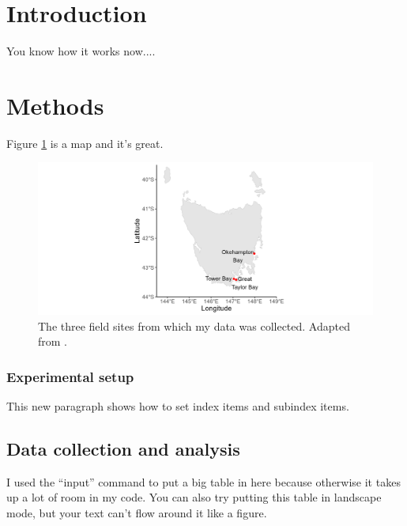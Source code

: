 \section{Introduction}
You know how it works now....

\section{Methods}

Figure \ref{2-fig:sites} is a map and it's great.

\begin{figure}[htbp]
    \centering
    \includegraphics[width=0.85\linewidth, trim={4cm 0cm 4cm 0cm}, %
        clip]{figures/C2_1st_data_chapter/map.png}
    \caption[
        The three field sites from which my data was collected
    ]{
        The three field sites from which my data was collected. Adapted from \citet{biancacci_optimisation_2022}.
    } \label{2-fig:sites}
\end{figure}

\subsubsection{Experimental setup}
This new paragraph shows how to set index items
and  subindex items.

\subsection{Data collection and analysis}
I used the ``input'' command to put a big table in here because otherwise it takes up a lot of room in my code.
You can also try putting this table in landscape mode, but your text can't flow around it like a figure. 

    

